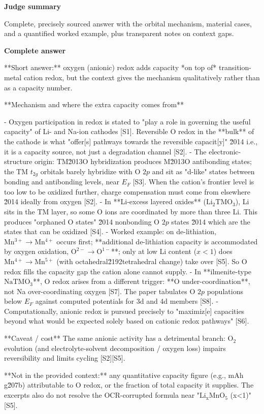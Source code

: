 \documentclass[10pt]{article}
\begin{document}
\textbf{Judge summary}
\begin{EvidenceText}
Complete, precisely sourced answer with the orbital mechanism, material cases, and a quantified worked example, plus transparent notes on context gaps.
\end{EvidenceText}

\textbf{Complete answer}
\begin{AnswerText}
**Short answer:** oxygen (anionic) redox adds capacity *on top of* transition-metal cation redox, but the context gives the mechanism qualitatively rather than as a capacity number.

**Mechanism and where the extra capacity comes from**

- Oxygen participation in redox is stated to "play a role in governing the useful capacity" of Li- and Na-ion cathodes [S1]. Reversible O redox in the **bulk** of the cathode is what "offer[s] pathways towards the reversible capacit[y]" \u2014 i.e., it is a capacity source, not just a degradation channel [S2].
- The electronic-structure origin: TM\u2013O hybridization produces M\u2013O antibonding states; the TM $t_{2g}$ orbitals barely hybridize with O $2p$ and sit as "d-like" states between bonding and antibonding levels, near $E_F$ [S3]. When the cation's frontier level is too low to be oxidized further, charge compensation must come from elsewhere \u2014 ideally from oxygen [S2].
- In **Li-excess layered oxides** ($\mathrm{Li_2TMO_3}$), Li sits in the TM layer, so some O ions are coordinated by more than three Li. This produces "orphaned O states" \u2014 nonbonding O $2p$ states \u2014 which are the states that can be oxidized [S4].
- Worked example: on de-lithiation, $\mathrm{Mn^{3+}\!\to\!Mn^{4+}}$ occurs first; **additional de-lithiation capacity is accommodated by oxygen oxidation, $\mathrm{O^{2-}\!\to\!O^{1-}}$**; only at low Li content ($x<1$) does $\mathrm{Mn^{4+}\!\to\!Mn^{5+}}$ (with octahedral\u2192tetrahedral change) take over [S5]. So O redox fills the capacity gap the cation alone cannot supply.
- In **ilmenite-type $\mathrm{NaTMO_3}$**, O redox arises from a different trigger: **O under-coordination**, not Na over-coordinating oxygen [S7]. The paper tabulates O $2p$ populations below $E_F$ against computed potentials for 3d and 4d members [S8].
- Computationally, anionic redox is pursued precisely to "maximiz[e] capacities beyond what would be expected solely based on cationic redox pathways" [S6].

**Caveat / cost**
The same anionic activity has a detrimental branch: O$_2$ evolution (and electrolyte-solvent decomposition / oxygen loss) impairs reversibility and limits cycling [S2][S5].

**Not in the provided context:** any quantitative capacity figure (e.g., mAh g\u207b) attributable to O redox, or the fraction of total capacity it supplies. The excerpts also do not resolve the OCR-corrupted formula near "$\mathrm{Li_xMnO_5}$ (x<1)" [S5].
\end{AnswerText}
\end{document}
